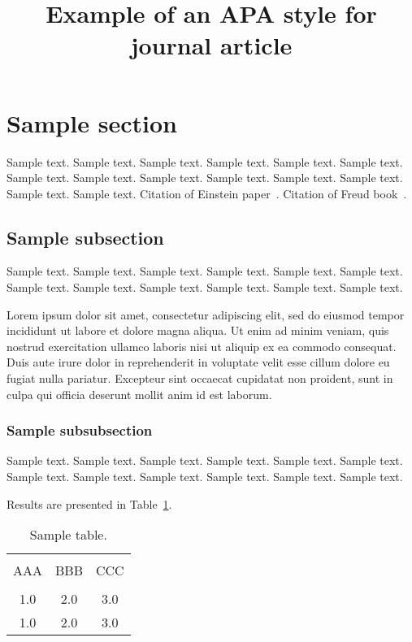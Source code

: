 \documentclass[jou,apacite]{apa6}
\title{Example of an APA style for journal article}
\begin{document}
\maketitle

\section{Sample section}
Sample text. Sample text. Sample text. Sample text. Sample text. Sample text.
Sample text. Sample text. Sample text. Sample text. Sample text. Sample text.
Sample text. Sample text. Citation of Einstein paper~\cite{Einstein}. Citation of Freud book~\cite{Freud}.

\subsection{Sample subsection}
Sample text. Sample text. Sample text. Sample text. Sample text. Sample text.
Sample text. Sample text. Sample text. Sample text. Sample text. Sample text.

Lorem ipsum dolor sit amet, consectetur adipiscing elit, sed do eiusmod tempor incididunt ut labore et dolore magna aliqua. Ut enim ad minim veniam, quis nostrud exercitation ullamco laboris nisi ut aliquip ex ea commodo consequat. Duis aute irure dolor in reprehenderit in voluptate velit esse cillum dolore eu fugiat nulla pariatur. Excepteur sint occaecat cupidatat non proident, sunt in culpa qui officia deserunt mollit anim id est laborum.

\subsubsection{Sample subsubsection}
Sample text. Sample text. Sample text. Sample text. Sample text. Sample text.
Sample text. Sample text. Sample text. Sample text. Sample text. Sample text.


Results are presented in Table~\ref{tab1}.
\begin{table}[!htb]
\caption{Sample table.}\label{tab1}
\begin{tabular}{ccc}
\hline\\[-1.5ex]
AAA & BBB & CCC \\[0.5ex]
\hline\\[-1.5ex]
1.0 & 2.0 & 3.0\\[0.5ex]
1.0 & 2.0 & 3.0\\[0.5ex]
\hline
\end{tabular}
\end{table}



\end{document}
